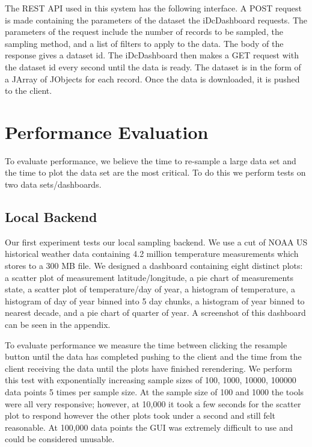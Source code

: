 \documentclass[letter,twocolumn]{article}
\begin{document}
The REST API used in this system has the following interface.
A POST request is made containing the parameters of the dataset the iDcDashboard requests.
The parameters of the request include the number of records to be sampled, the sampling method, and a list of filters to apply to the data.
The body of the response gives a dataset id.
The iDcDashboard then makes a GET request with the dataset id every second until the data is ready.
The dataset is in the form of a JArray of JObjects for each record.
Once the data is downloaded, it is pushed to the client.

\section{Performance Evaluation}%

To evaluate performance, we believe the time to re-sample a large data set and the time to plot the data set are the most critical.
To do this we perform tests on two data sets/dashboards.

\subsection{Local Backend}

Our first experiment tests our local sampling backend.
We use a cut of NOAA US historical weather data containing 4.2 million temperature measurements which stores to a 300 MB file.
We designed a dashboard containing eight distinct plots: a scatter plot of measurement latitude/longitude, a pie chart of measurements state, a scatter plot of temperature/day of year,  a histogram of temperature, a histogram of day of year binned into 5 day chunks, a histogram of year binned to nearest decade, and a pie chart of quarter of year.
A screenshot of this dashboard can be seen in the appendix.

To evaluate performance we measure the time between clicking the resample button until the data has completed pushing to the client and the time from the client receiving the data until the plots have finished rerendering.
We perform this test with exponentially increasing sample sizes of 100, 1000, 10000, 100000 data points 5 times per sample size.
At the sample size of 100 and 1000 the tools were all very responsive; however, at 10,000 it took a few seconds for the scatter plot to respond however the other plots took under a second and still felt reasonable.  
At 100,000 data points the GUI was extremely difficult to use and could be considered unusable.
\end{document}
